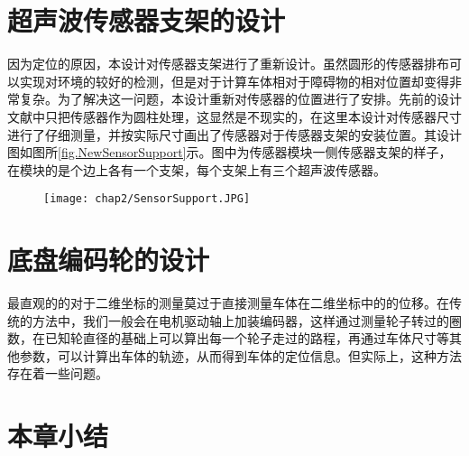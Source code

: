 \section{超声波传感器支架的设计}
因为定位的原因，本设计对传感器支架进行了重新设计。虽然圆形的传感器排布可以实现对环境的较好的检测，但是对于计算车体相对于障碍物的相对位置却变得非常复杂。为了解决这一问题，本设计重新对传感器的位置进行了安排。先前的设计文献中只把传感器作为圆柱处理，这显然是不现实的，在这里本设计对传感器尺寸进行了仔细测量，并按实际尺寸画出了传感器对于传感器支架的安装位置。其设计图如图所\ref{fig.NewSensorSupport}示。图中为传感器模块一侧传感器支架的样子，在模块的是个边上各有一个支架，每个支架上有三个超声波传感器。
\begin{figure}[!htp]
  \centering
  \texttt{[image: chap2/SensorSupport.JPG]}
\end{figure}
\section{底盘编码轮的设计}
最直观的的对于二维坐标的测量莫过于直接测量车体在二维坐标中的的位移。在传统的方法中，我们一般会在电机驱动轴上加装编码器，这样通过测量轮子转过的圈数，在已知轮直径的基础上可以算出每一个轮子走过的路程，再通过车体尺寸等其他参数，可以计算出车体的轨迹，从而得到车体的定位信息。但实际上，这种方法存在着一些问题。
\section{本章小结}

